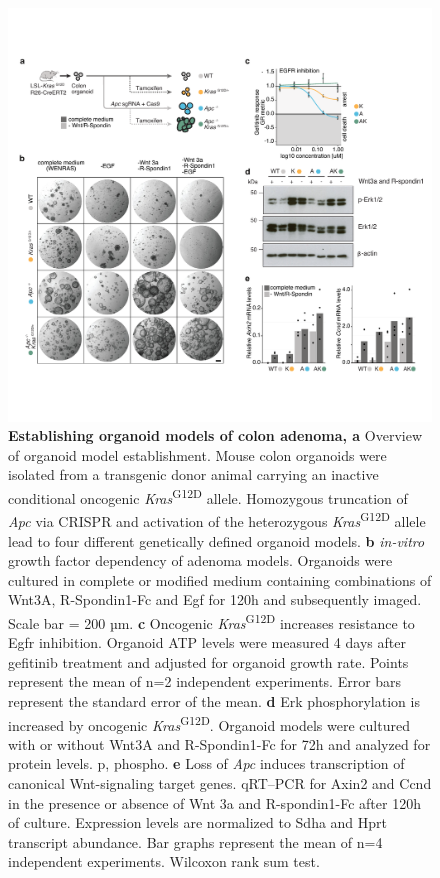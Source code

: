 \begin{flushleft}
\begin{figure}[H]
\centering
\includegraphics[width=\textwidth,
                keepaspectratio]{figures/adenomaprofiling/pdf/fig_1_0.pdf}
\caption[Establishing organoid models of colon adenoma]{\textbf{Establishing organoid models of colon adenoma, a} Overview of organoid model establishment. Mouse colon organoids were isolated from a transgenic donor animal carrying an inactive conditional oncogenic \textit{Kras}\textsuperscript{G12D} allele. Homozygous truncation of \textit{Apc} via CRISPR and activation of the heterozygous \textit{Kras}\textsuperscript{G12D} allele lead to four different genetically defined organoid models.
\textbf{b} \textit{in-vitro} growth factor dependency of adenoma models. Organoids were cultured in complete or modified medium containing combinations of Wnt3A, R-Spondin1-Fc and Egf for 120h and subsequently imaged. Scale bar = 200 µm.
\textbf{c}	Oncogenic \textit{Kras}\textsuperscript{G12D} increases resistance to Egfr inhibition. Organoid ATP levels were measured 4 days after gefitinib treatment and adjusted for organoid growth rate. Points represent the mean of n=2 independent experiments. Error bars represent the standard error of the mean.
\textbf{d} Erk phosphorylation is increased by oncogenic \textit{Kras}\textsuperscript{G12D}. Organoid models were cultured with or without Wnt3A and R-Spondin1-Fc for 72h and analyzed for protein levels. p, phospho.   
\textbf{e}	Loss of \textit{Apc} induces transcription of canonical Wnt-signaling target genes. qRT–PCR for Axin2 and Ccnd in the presence or absence of Wnt 3a and R-spondin1-Fc after 120h of culture. Expression levels are normalized to Sdha and Hprt transcript abundance. Bar graphs represent the mean of n=4 independent experiments. Wilcoxon rank sum test.
}
\label{fig_a10}
\end{figure}


\end{flushleft}
